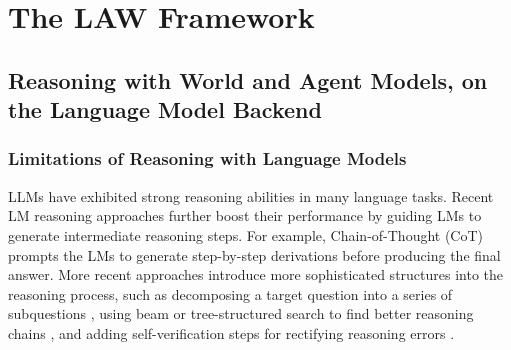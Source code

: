 \documentclass{article}
\begin{document}





\section{The LAW Framework}\label{sec:law}

\subsection{Reasoning with World and Agent Models, on the Language Model Backend}\label{sec:law:inference}

\subsubsection{Limitations of Reasoning with Language Models}

LLMs have exhibited strong reasoning abilities in many language tasks. Recent LM reasoning approaches further boost their performance by guiding LMs to generate intermediate reasoning steps. For example, Chain-of-Thought (CoT) \citep{wei2022chain}  prompts the LMs to generate step-by-step derivations before producing the final answer. More recent approaches introduce more sophisticated structures into the reasoning process, such as decomposing a target question into a series of subquestions \citep{zhou2022least,xie2023decomposition}, using beam or tree-structured search to find better reasoning chains \citep{Yao2023TreeOT,jung2022maieutic,zhu2022solving,liu2023llm+}, and adding self-verification steps for rectifying reasoning errors \citep{ouyang2023structured,shinn2023reflexion,madaan2023self,weng2022large}.
\end{document}
